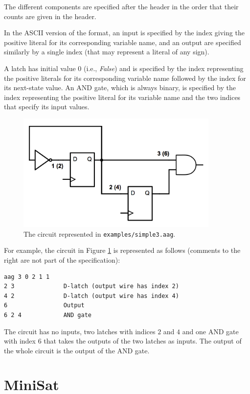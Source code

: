\documentclass[12pt,a4paper,twoside,openright]{report}
\begin{document}
{{The different components are specified after the header
in the order that their counts are given in the header.

In the ASCII version of the format, an input is specified by the
index giving the positive literal for its corresponding variable name,
and an output are specified similarly by a single index (that may represent
a literal of any sign).

A latch has initial value 0 (i.e., {\it False}) and is specified by the
index representing the positive literals for its corresponding variable name
followed by the index for its next-state value.
An AND gate, which is always binary,
is specified by the index representing the positive literal
for its variable name and the two indices that specify its input values.

\begin{figure}[t]
\centering
\includegraphics[width=100mm]{circuit.png}
\caption{The circuit represented in {\tt examples/simple3.aag}.}
\label{aagCircuit}
\end{figure}

For example, the circuit in Figure \ref{aagCircuit} is represented
as follows (comments to the right are not part of the specification):
\begin{verbatim}
aag 3 0 2 1 1
2 3              D-latch (output wire has index 2)
4 2              D-latch (output wire has index 4)
6                Output
6 2 4            AND gate
\end{verbatim}
The circuit has no inputs, two latches with indices $2$ and $4$ and one AND gate
with index $6$ that takes the outputs of the two latches as inputs.
The output of the whole circuit is the output of the AND gate.
}


\section{MiniSat}
\label{prep:minisat}

}
\end{document}
